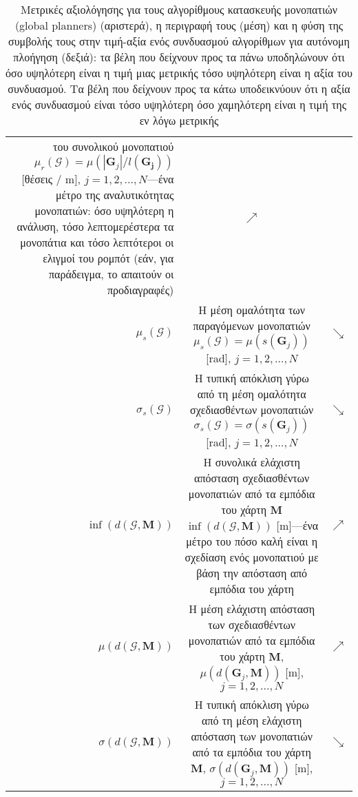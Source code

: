 \begin{table}
\begin{tabular}{rcc}
\begin{minipage}[t]{0.7\columnwidth}
      του συνολικού μονοπατιού
      $\mu_r(\bm{\mathcal{G}}) = \mu(|\bm{G}_j| / l(\bm{\bm{G}_j}))$
      [θέσεις / m], $j = 1,2,\dots,N$---ένα μέτρο της αναλυτικότητας μονοπατιών:
      όσο υψηλότερη η ανάλυση, τόσο λεπτομερέστερα τα μονοπάτια και τόσο
      λεπτότεροι οι ελιγμοί του ρομπότ (εάν, για παράδειγμα, το απαιτούν οι
      προδιαγραφές)
    \end{minipage} & $\nearrow$ \\
    $\mu_{s}(\bm{\mathcal{G}})$ &
    \begin{minipage}[t]{0.7\columnwidth}%
      Η μέση ομαλότητα των παραγόμενων μονοπατιών
      $\mu_s(\bm{\mathcal{G}}) = \mu(s(\bm{G}_j))$ [rad], $j = 1,2,\dots,N$
    \end{minipage} &
    $\searrow$ \\
    $\sigma_{s}(\bm{\mathcal{G}})$ &
    \begin{minipage}[t]{0.7\columnwidth}%
      Η τυπική απόκλιση γύρω από τη μέση ομαλότητα σχεδιασθέντων μονοπατιών
      $\sigma_s(\bm{\mathcal{G}}) = \sigma(s(\bm{G}_j))$ [rad], $j = 1,2,\dots,N$
    \end{minipage} & $\searrow$ \\
    $\inf(d(\bm{\mathcal{G}},\bm{M}))$ &
    \begin{minipage}[t]{0.7\columnwidth}%
      Η συνολικά ελάχιστη απόσταση σχεδιασθέντων μονοπατιών από τα εμπόδια του
      χάρτη $\bm{M}$
      $\inf(d(\bm{\mathcal{G}},\bm{M}))$ [m]---ένα μέτρο του πόσο καλή είναι
      η σχεδίαση ενός μονοπατιού με βάση την απόσταση από εμπόδια του χάρτη
    \end{minipage} & $\nearrow$ \\
    $\mu(d(\bm{\mathcal{G}}, \bm{M}))$ &
    \begin{minipage}[t]{0.7\columnwidth}%
      Η μέση ελάχιστη απόσταση των σχεδιασθέντων μονοπατιών από τα εμπόδια του
      χάρτη $\bm{M}$, $\mu(d(\bm{G}_j,\bm{M}))$ [m], $j = 1,2,\dots,N$
    \end{minipage} & $\nearrow$ \\
    $\sigma(d(\bm{\mathcal{G}},\bm{M}))$ &
    \begin{minipage}[t]{0.7\columnwidth}%
      Η τυπική απόκλιση γύρω από τη μέση ελάχιστη απόσταση των μονοπατιών
      από τα εμπόδια του χάρτη $\bm{M}$, $\sigma(d(\bm{G}_j,\bm{M}))$ [m],
      $j = 1,2,\dots,N$
    \end{minipage} & $\searrow$ \\ \bottomrule
  \end{tabular}
  \caption{\small Μετρικές αξιολόγησης για τους αλγορίθμους κατασκευής μονοπατιών
           (global planners) (αριστερά), η περιγραφή τους (μέση) και η φύση
           της συμβολής τους στην τιμή-αξία ενός συνδυασμού αλγορίθμων για
           αυτόνομη πλοήγηση (δεξιά): τα βέλη που δείχνουν προς τα πάνω
           υποδηλώνουν ότι όσο υψηλότερη είναι η τιμή μιας μετρικής τόσο
           υψηλότερη είναι η αξία του συνδυασμού. Tα βέλη που δείχνουν προς τα
           κάτω υποδεικνύουν ότι η αξία ενός συνδυασμού είναι τόσο υψηλότερη
           όσο χαμηλότερη είναι η τιμή της εν λόγω μετρικής}
  \label{tbl:metrics_and_proportionality_global_planners}
\end{table}

